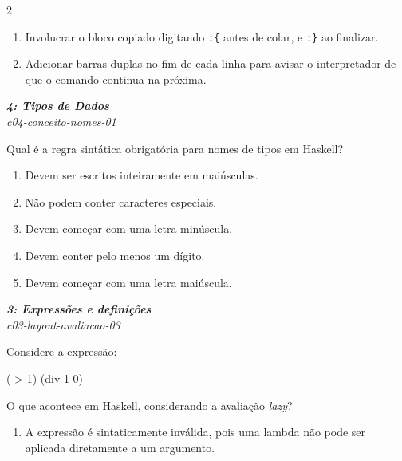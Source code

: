 \documentclass[a4paper,10pt,brazil]{article}
\begin{document}
\begin{multicols}{2}
\begin{enumerate}
  \item Involucrar o bloco copiado digitando \texttt{:\{} antes de colar, e \texttt{:\}} ao finalizar.

  \item Adicionar barras duplas \haskellinline{//} no fim de cada linha para avisar o interpretador de que o comando continua na próxima.


\end{enumerate}

\begin{flushright}
  \footnotesize
  \textit{\textbf{4: Tipos de Dados}}\\
  \textit{c04-conceito-nomes-01}\\

\end{flushright}
Qual é a regra sintática obrigatória para nomes de tipos em Haskell?

\begin{enumerate}
  \item Devem ser escritos inteiramente em maiúsculas.

  \item Não podem conter caracteres especiais.

  \item Devem começar com uma letra minúscula.

  \item Devem conter pelo menos um dígito.

  \item Devem começar com uma letra maiúscula.


\end{enumerate}

\begin{flushright}
  \footnotesize
  \textit{\textbf{3: Expressões e definições}}\\
  \textit{c03-layout-avaliacao-03}\\

\end{flushright}
Considere a expressão:

\begin{haskellcode}
(\x -> 1) (div 1 0)
\end{haskellcode}

O que acontece em Haskell, considerando a avaliação \emph{lazy}?

\begin{enumerate}
  \item A expressão é sintaticamente inválida, pois uma lambda não pode ser aplicada diretamente a um argumento.


\end{enumerate}
\end{multicols}
\end{document}
